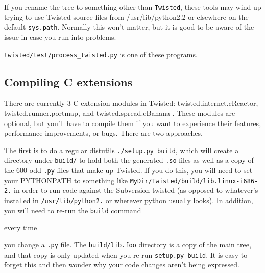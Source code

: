 If you rename the tree to something other than \texttt{Twisted}, these tools may wind up trying to use Twisted source files from /usr/lib/python2.2 or elsewhere on the default \texttt{sys.\linebreak[1]path}.  Normally this won't matter, but it is good to be aware of the issue in case you run into problems.

\texttt{twisted/test/process\_twisted.\linebreak[1]py} is one of these programs.

\subsection{Compiling C extensions}


There are currently 3 C extension modules in Twisted: twisted.internet.cReactor, twisted.runner.portmap, and twisted.spread.cBanana . These modules are optional, but you'll have to compile them if you want to experience their features, performance improvements, or bugs. There are two approaches.

The first is to do a regular distutils \texttt{./setup.\linebreak[1]py build}, which will create a directory under \texttt{build/} to hold both the generated \texttt{.so} files as well as a copy of the 600-odd \texttt{.py} files that make up Twisted. If you do this, you will need to set your PYTHONPATH to something like \texttt{My\linebreak[1]Dir/Twisted/build/lib.\linebreak[1]linux-i686-2.} in order to run code against the Subversion twisted (as opposed to whatever's installed in \texttt{/usr/lib/python2.} or wherever python usually looks). In addition, you will need to re-run the \texttt{build} command \begin{em}every time\end{em} you change a \texttt{.py} file. The \texttt{build/lib.\linebreak[1]foo} directory is a copy of the main tree, and that copy is only updated when you re-run \texttt{setup.\linebreak[1]py build}. It is easy to forget this and then wonder why your code changes aren't being expressed.


